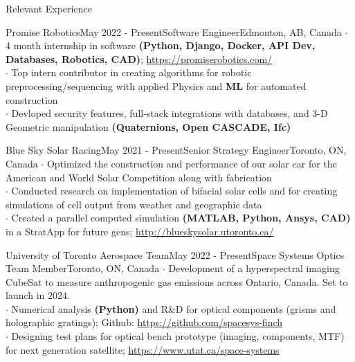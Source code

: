 \documentclass[UTF8]{resume} %
\begin{document}
\begin{rSection}{Relevant Experience}
\begin{rSubsection}{Promise Robotics}{May 2022 - Present}{Software Engineer}{Edmonton, AB, Canada}
    $\cdot$ 4 month internship in software \textbf{(Python, Django, Docker, API Dev, Databases, Robotics, CAD)}; \href{https://promiserobotics.com/}{https://promiserobotics.com/}\\
    $\cdot$ Top intern contributor in creating algorithms for robotic preprocessing/sequencing with applied Physics and \textbf{ML} for automated construction  \\
    $\cdot$ Devloped security features, full-stack integrations with databases, and 3-D Geometric manipulation \textbf{(Quaternions, Open CASCADE, Ifc)}
\end{rSubsection}
\begin{rSubsection}{Blue Sky Solar Racing}{May 2021 - Present}{Senior Strategy Engineer}{Toronto, ON, Canada}
    $\cdot$ Optimized the construction and performance of our solar car for the American and World Solar Competition along with fabrication\\
    $\cdot$ Conducted research on implementation of bifacial solar cells and for creating simulations of cell output from weather and geographic data\\
    $\cdot$ Created a parallel computed simulation \textbf{(MATLAB, Python, Ansys, CAD)} in a StratApp for future gens; \href{http://blueskysolar.utoronto.ca/}{http://blueskysolar.utoronto.ca/}
\end{rSubsection}
\begin{rSubsection}{University of Toronto Aerospace Team}{May 2022 - Present}{Space Systems Optics Team Member}{Toronto, ON, Canada}
    $\cdot$ Development of a hyperspectral imaging CubeSat to measure anthropogenic gas emissions across Ontario, Canada. Set to launch in 2024. \\
    $\cdot$ Numerical analysis \textbf{(Python)} and R\&D for optical components (grisms and holographic gratings); Github: \href{https://github.com/spacesys-finch}{https://github.com/spacesys-finch}\\
    $\cdot$ Designing test plans for optical bench prototype (imaging, components, MTF) for next generation satellite; \href{https://www.utat.ca/space-systems}{https://www.utat.ca/space-systems}
\end{rSubsection}
\end{rSection}
\end{document}
